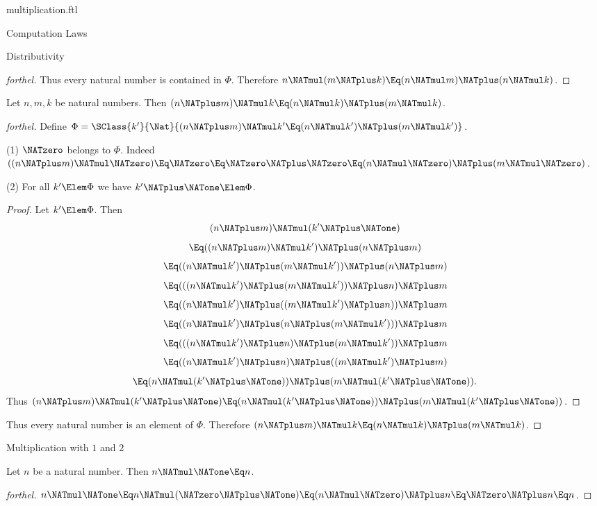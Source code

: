\documentclass{stex}
\begin{document}
\begin{smodule}{multiplication.ftl}
\begin{sfragment}{Computation Laws}
\begin{sfragment}{Distributivity}
\begin{proof}[forthel]
      Thus every natural number is contained in $\Phi$.
      Therefore $n \NATmul (m \NATplus k) \Eq (n \NATmul m) \NATplus (n \NATmul k)$.
    \end{proof}

    \begin{proposition}[forthel]
      Let $n, m, k$ be natural numbers.
      Then $(n \NATplus m) \NATmul k \Eq (n \NATmul k) \NATplus (m \NATmul k)$.
    \end{proposition}
    \begin{proof}[forthel]
      Define $\Phi = \SClass{k'}{\Nat}{(n \NATplus m) \NATmul k' \Eq (n \NATmul k') \NATplus (m \NATmul k')}$.

      (1) $\NATzero$ belongs to $\Phi$.
      Indeed $((n \NATplus m) \NATmul \NATzero)
        \Eq \NATzero
        \Eq \NATzero \NATplus \NATzero
        \Eq (n \NATmul \NATzero) \NATplus (m \NATmul \NATzero)$.

      (2) For all $k' \Elem \Phi$ we have $k' \NATplus \NATone \Elem \Phi$.
      \begin{proof}
        Let $k' \Elem \Phi$.
        Then
        \[  (n \NATplus m) \NATmul (k' \NATplus \NATone)                        \]
        \[    \Eq ((n \NATplus m) \NATmul k') \NATplus (n \NATplus m)              \]
        \[    \Eq ((n \NATmul k') \NATplus (m \NATmul k')) \NATplus (n \NATplus m)   \]
        \[    \Eq (((n \NATmul k') \NATplus (m \NATmul k')) \NATplus n) \NATplus m   \]
        \[    \Eq ((n \NATmul k') \NATplus ((m \NATmul k') \NATplus n)) \NATplus m   \]
        \[    \Eq ((n \NATmul k') \NATplus (n \NATplus (m \NATmul k'))) \NATplus m   \]
        \[    \Eq (((n \NATmul k') \NATplus n) \NATplus (m \NATmul k')) \NATplus m   \]
        \[    \Eq ((n \NATmul k') \NATplus n) \NATplus ((m \NATmul k') \NATplus m)   \]
        \[    \Eq (n \NATmul (k' \NATplus \NATone)) \NATplus (m \NATmul (k' \NATplus \NATone)).  \]
        Thus $(n \NATplus m) \NATmul (k' \NATplus \NATone) \Eq (n \NATmul (k' \NATplus \NATone)) \NATplus (m \NATmul (k' \NATplus \NATone))$.
      \end{proof}

      Thus every natural number is an element of $\Phi$.
      Therefore $(n \NATplus m) \NATmul k \Eq (n \NATmul k) \NATplus (m \NATmul k)$.
    \end{proof}
  \end{sfragment}

  \begin{sfragment}{Multiplication with $1$ and $2$}
    \begin{proposition}[forthel]
      Let $n$ be a natural number.
      Then $n \NATmul \NATone \Eq n$.
    \end{proposition}
    \begin{proof}[forthel]
      $n \NATmul \NATone
        \Eq n \NATmul (\NATzero \NATplus \NATone)
        \Eq (n \NATmul \NATzero) \NATplus n
        \Eq \NATzero \NATplus n
        \Eq n$.
    \end{proof}


\end{sfragment}
\end{sfragment}
\end{smodule}
\end{document}
